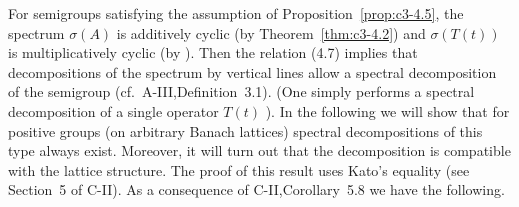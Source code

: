 %



For semigroups satisfying the assumption of Proposition~\ref{prop:c3-4.5}, the spectrum $\sigma(A)$ is additively cyclic (by Theorem~\ref{thm:c3-4.2}) and $\sigma(T(t))$ is multiplicatively cyclic
(by \citet[V.Theorem~4.4]{schaefer:1974}). Then the relation (4.7) implies that
decompositions of the spectrum by vertical lines allow a spectral
decomposition of the semigroup (cf.\ A-III,Definition~3.1). (One simply performs a spectral decomposition of a single operator $T(t)$ ). In the
following we will show that for positive groups (on arbitrary Banach
lattices) spectral decompositions of this type always exist. Moreover,
it will turn out that the decomposition is compatible with the lattice
structure. The proof of this result uses Kato's equality (see Section~5 of
C-II). As a consequence of C-II,Corollary~5.8 we have the following.

